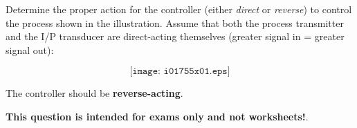 

Determine the proper action for the controller (either {\it direct} or {\it reverse}) to control the process shown in the illustration.  Assume that both the process transmitter and the I/P transducer are direct-acting themselves (greater signal in = greater signal out):

$$\texttt{[image: i01755x01.eps]}$$







The controller should be {\bf reverse-acting}.







{\bf This question is intended for exams only and not worksheets!}.



